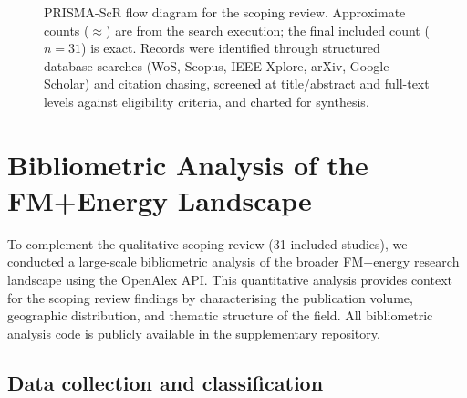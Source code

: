 \documentclass[preprint,12pt]{elsarticle}
\begin{document}
\begin{figure}[htbp]
\caption{PRISMA-ScR flow diagram for the scoping review. Approximate counts ($\approx$) are from the search execution; the final included count ($n = 31$) is exact. Records were identified through structured database searches (WoS, Scopus, IEEE Xplore, arXiv, Google Scholar) and citation chasing, screened at title/abstract and full-text levels against eligibility criteria, and charted for synthesis.}
\label{fig:prisma}
\end{figure}

\section{Bibliometric Analysis of the FM+Energy Landscape}
\label{sec:bibliometrics}

To complement the qualitative scoping review (31 included studies), we conducted a large-scale bibliometric analysis of the broader FM+energy research landscape using the OpenAlex API. This quantitative analysis provides context for the scoping review findings by characterising the publication volume, geographic distribution, and thematic structure of the field. All bibliometric analysis code is publicly available in the supplementary repository.

\subsection{Data collection and classification}
\label{subsec:biblio_collection}
\end{document}
